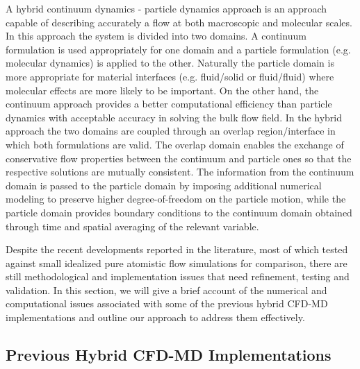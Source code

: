 \documentclass[preprint,12pt]{elsarticle}
\begin{document}
A hybrid continuum dynamics - particle dynamics approach is an approach 
capable of describing accurately a flow at both macroscopic and molecular scales. 
In this approach the system is divided into two domains. 
A continuum formulation is used appropriately for one domain and 
a particle formulation (e.g. molecular dynamics) is applied to the other.
Naturally the particle domain is more appropriate for material interfaces 
(e.g. fluid/solid or fluid/fluid) where molecular effects are more likely to be important. 
On the other hand, the continuum approach provides a better computational efficiency than
particle dynamics with acceptable accuracy in solving the bulk flow field.
In the hybrid approach the two domains are coupled through an overlap region/interface 
in which both formulations are valid. The overlap domain enables the exchange of 
conservative flow properties between the continuum and particle ones so that 
the respective solutions are mutually consistent. 
The information from the continuum domain is passed to the particle domain 
by imposing additional numerical modeling to preserve higher degree-of-freedom 
on the particle motion, while the particle domain provides boundary conditions 
to the continuum domain obtained through time and spatial averaging of the relevant variable.

Despite the recent developments reported in the literature, most of which tested 
against small idealized pure atomistic flow simulations for comparison, 
there are still methodological and implementation issues that need refinement, 
testing and validation. In this section, we will give a brief account of the numerical and 
computational issues associated with some of the previous hybrid CFD-MD implementations 
and outline our approach to address them effectively.


\subsection{Previous Hybrid CFD-MD Implementations}
\label{sec:intro_formerworks}
\end{document}
